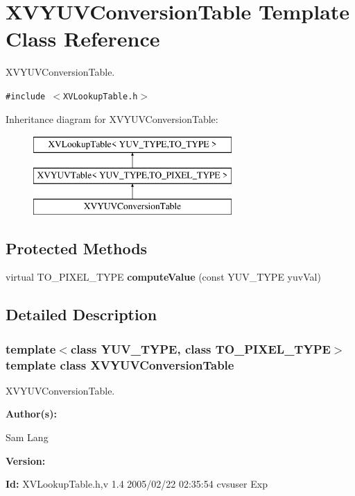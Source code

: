 \hypertarget{class_XVYUVConversionTable}{
\section{XVYUVConversion\-Table  Template Class Reference}
\label{XVYUVConversionTable}
}
XVYUVConversion\-Table. 


{\tt \#include $<$XVLookup\-Table.h$>$}

Inheritance diagram for XVYUVConversion\-Table:\begin{figure}[H]
\begin{center}
\leavevmode
\includegraphics[height=3cm]{class_XVYUVConversionTable}
\end{center}
\end{figure}
\subsection*{Protected Methods}
\begin{CompactItemize}
\item 
virtual TO\_\-PIXEL\_\-TYPE {\bf compute\-Value} (const YUV\_\-TYPE yuv\-Val)
\end{CompactItemize}


\subsection{Detailed Description}
\subsubsection*{template$<$class YUV\_\-TYPE, class TO\_\-PIXEL\_\-TYPE$>$  template class XVYUVConversion\-Table}

XVYUVConversion\-Table.

\begin{Desc}
\item[{\bf Author(s): }]\par
 Sam Lang \end{Desc}
\begin{Desc}
\item[{\bf Version: }]\par
 \end{Desc}
\begin{Desc}
\item[{\bf Id: }] XVLookup\-Table.h,v 1.4 2005/02/22 02:35:54 cvsuser Exp \end{Desc}


